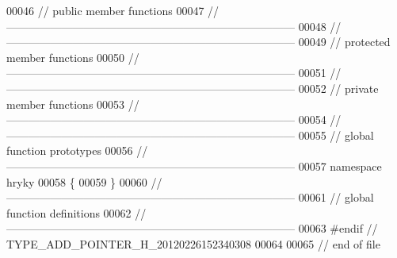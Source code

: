 \begin{DoxyCode}
00046 \textcolor{comment}{// public member functions}
00047 \textcolor{comment}{//
      ------------------------------------------------------------------------------}
00048 \textcolor{comment}{//
      ------------------------------------------------------------------------------}
00049 \textcolor{comment}{// protected member functions}
00050 \textcolor{comment}{//
      ------------------------------------------------------------------------------}
00051 \textcolor{comment}{//
      ------------------------------------------------------------------------------}
00052 \textcolor{comment}{// private member functions}
00053 \textcolor{comment}{//
      ------------------------------------------------------------------------------}
00054 \textcolor{comment}{//
      ------------------------------------------------------------------------------}
00055 \textcolor{comment}{// global function prototypes}
00056 \textcolor{comment}{//
      ------------------------------------------------------------------------------}
00057 \textcolor{keyword}{namespace }hryky
00058 \{
00059 \}
00060 \textcolor{comment}{//
      ------------------------------------------------------------------------------}
00061 \textcolor{comment}{// global function definitions}
00062 \textcolor{comment}{//
      ------------------------------------------------------------------------------}
00063 \textcolor{preprocessor}{#endif // TYPE\_ADD\_POINTER\_H\_20120226152340308}
00064 \textcolor{preprocessor}{}
00065 \textcolor{comment}{// end of file}
\end{DoxyCode}
